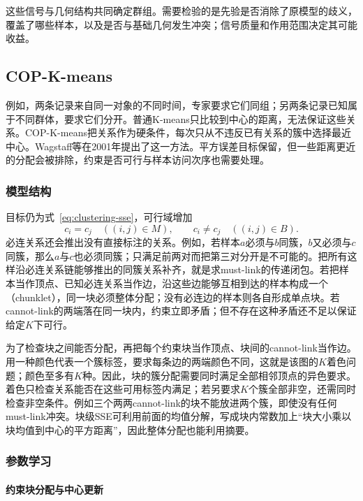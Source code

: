 这些信号与几何结构共同确定群组。需要检验的是先验是否消除了原模型的歧义，覆盖了哪些样本，以及是否与基础几何发生冲突；信号质量和作用范围决定其可能收益。
\subsection{COP-K-means}
\label{sec:clustering-cop}

例如，两条记录来自同一对象的不同时间，专家要求它们同组；另两条记录已知属于不同群体，要求它们分开。普通K-means只比较到中心的距离，无法保证这些关系。COP-K-means把关系作为硬条件，每次只从不违反已有关系的簇中选择最近中心。Wagstaff等在2001年提出了这一方法。平方误差目标保留，但一些距离更近的分配会被排除，约束是否可行与样本访问次序也需要处理。

\subsubsection{模型结构}

目标仍为式~\eqref{eq:clustering-sse}，可行域增加
\begin{equation}
 c_i=c_j\quad((i,j)\in M),\qquad
 c_i\ne c_j\quad((i,j)\in B).
 \label{eq:clustering-cop}
\end{equation}
必连关系还会推出没有直接标注的关系。例如，若样本$a$必须与$b$同簇，$b$又必须与$c$同簇，那么$a$与$c$也必须同簇；只满足前两对而把第三对分开是不可能的。把所有这样沿必连关系链能够推出的同簇关系补齐，就是求must-link的传递闭包。若把样本当作顶点、已知必连关系当作边，沿这些边能够互相到达的样本构成一个（chunklet），同一块必须整体分配；没有必连边的样本则各自形成单点块。若cannot-link的两端落在同一块内，约束立即矛盾；但不存在这种矛盾还不足以保证给定$K$下可行。

为了检查块之间能否分配，再把每个约束块当作顶点、块间的cannot-link当作边。用一种颜色代表一个簇标签，要求每条边的两端颜色不同，这就是该图的$K$着色问题；颜色至多有$K$种。因此，块的簇分配需要同时满足全部相邻顶点的异色要求。着色只检查关系能否在这些可用标签内满足；若另要求$K$个簇全部非空，还需同时检查非空条件。例如三个两两cannot-link的块不能放进两个簇，即使没有任何must-link冲突。块级SSE可利用前面的均值分解，写成块内常数加上“块大小乘以块均值到中心的平方距离”，因此整体分配也能利用摘要。

\subsubsection{参数学习}

\paragraph{约束块分配与中心更新}

